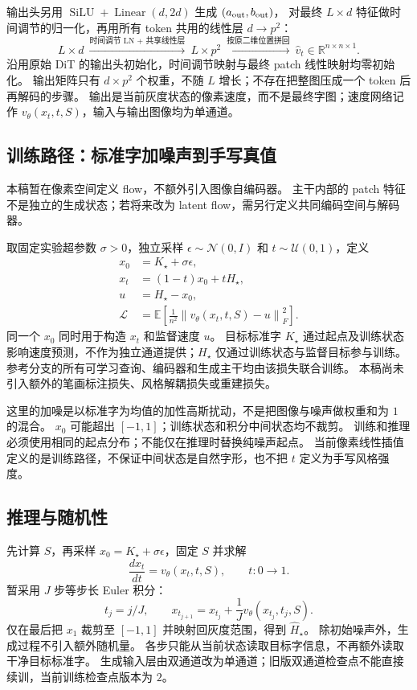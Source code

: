 \documentclass[UTF8,fontset=fandol,zihao=5,a4paper]{ctexart}
\newcommand{\R}{\mathbb R}
\begin{document}
输出头另用 $\operatorname{SiLU}+\operatorname{Linear}(d,2d)$ 生成 $(a_{\rm out},b_{\rm out})$，
对最终 $L\times d$ 特征做时间调节的归一化，再用所有 token 共用的线性层 $d\to p^2$：
\[
L\times d
\ \xrightarrow{\text{时间调节 LN + 共享线性层}}\
L\times p^2
\ \xrightarrow{\text{按原二维位置拼回}}\
\widehat v_t\in\R^{n\times n\times1}.
\]
沿用原始 DiT 的输出头初始化，时间调节映射与最终 patch 线性映射均零初始化。
输出矩阵只有 $d\times p^2$ 个权重，不随 $L$ 增长；不存在把整图压成一个 token 后再解码的步骤。
输出是当前灰度状态的像素速度，而不是最终字图；速度网络记作 $v_\theta(x_t,t,S)$，输入与输出图像均为单通道。

\subsection{训练路径：标准字加噪声到手写真值}

本稿暂在像素空间定义 flow，不额外引入图像自编码器。
主干内部的 patch 特征不是独立的生成状态；若将来改为 latent flow，需另行定义共同编码空间与解码器。

取固定实验超参数 $\sigma>0$，独立采样 $\epsilon\sim\mathcal N(0,I)$ 和 $t\sim\mathcal U(0,1)$，定义
\begin{align*}
x_0&=K_\star+\sigma\epsilon,\\
x_t&=(1-t)x_0+tH_\star,\\
u&=H_\star-x_0,\\
\mathcal L&=\mathbb E\left[\frac{1}{n^2}
\left\|v_\theta(x_t,t,S)-u\right\|_F^2\right].
\end{align*}
同一个 $x_0$ 同时用于构造 $x_t$ 和监督速度 $u$。
目标标准字 $K_\star$ 通过起点及训练状态影响速度预测，不作为独立通道提供；$H_\star$ 仅通过训练状态与监督目标参与训练。
参考分支的所有可学习查询、编码器和生成主干均由该损失联合训练。
本稿尚未引入额外的笔画标注损失、风格解耦损失或重建损失。

这里的加噪是以标准字为均值的加性高斯扰动，不是把图像与噪声做权重和为 $1$ 的混合。
$x_0$ 可能超出 $[-1,1]$；训练状态和积分中间状态均不裁剪。
训练和推理必须使用相同的起点分布；不能仅在推理时替换纯噪声起点。
当前像素线性插值定义的是训练路径，不保证中间状态是自然字形，也不把 $t$ 定义为手写风格强度。

\subsection{推理与随机性}

先计算 $S$，再采样 $x_0=K_\star+\sigma\epsilon$，固定 $S$ 并求解
\[
\frac{dx_t}{dt}=v_\theta(x_t,t,S),\qquad t:0\longrightarrow1.
\]
暂采用 $J$ 步等步长 Euler 积分：
\[
t_j=j/J,\qquad x_{t_{j+1}}=x_{t_j}+\frac1Jv_\theta(x_{t_j},t_j,S).
\]
仅在最后把 $x_1$ 裁剪至 $[-1,1]$ 并映射回灰度范围，得到 $\widehat H_\star$。
除初始噪声外，生成过程不引入额外随机量。
各步只能从当前状态读取目标字信息，不再额外读取干净目标标准字。
生成输入层由双通道改为单通道；旧版双通道检查点不能直接续训，当前训练检查点版本为 $2$。
\end{document}
